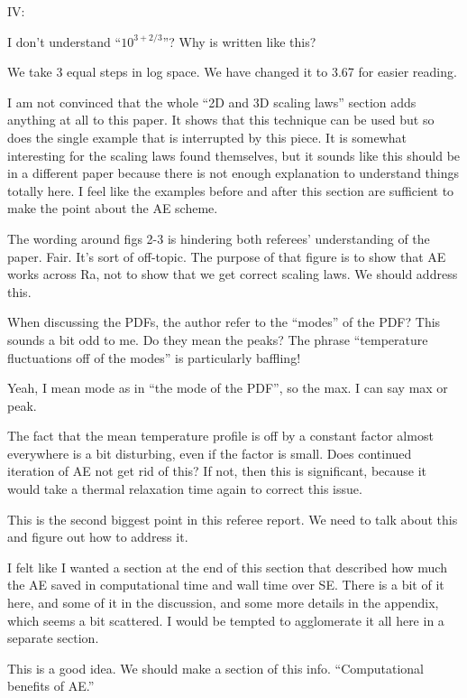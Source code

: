 \documentclass[aps, 11pt, singlecolumn]{revtex4-1} %
\begin{document}
\begin{singlespace}
\begin{myquotation}
IV:

I don’t understand ``$10^{3+2/3}$''? Why is written like this?
\end{myquotation}
We take 3 equal steps in log space. We have changed it to 3.67 for easier reading.


\begin{myquotation}
I am not convinced that the whole ``2D and 3D scaling laws'' section
adds anything at all to this paper. It shows that this technique can
be used but so does the single example that is interrupted by this
piece. It is somewhat interesting for the scaling laws found
themselves, but it sounds like this should be in a different paper
because there is not enough explanation to understand things totally
here. I feel like the examples before and after this section are
sufficient to make the point about the AE scheme.
\end{myquotation}
The wording around figs 2-3 is hindering both referees' understanding of the paper.
Fair. It's sort of off-topic. The purpose of that figure is to show that
AE works across Ra, not to show that we get correct scaling laws. We
should address this.

\begin{myquotation}
When discussing the PDFs, the author refer to the “modes” of the PDF?
This sounds a bit odd to me. Do they mean the peaks? The phrase
“temperature fluctuations off of the modes” is particularly baffling!
\end{myquotation}
Yeah, I mean mode as in ``the mode of the PDF'', so the max. I can say max
or peak.

\begin{myquotation}
The fact that the mean temperature profile is off by a constant factor
almost everywhere is a bit disturbing, even if the factor is small.
Does continued iteration of AE not get rid of this? If not, then this
is significant, because it would take a thermal relaxation time again
to correct this issue.
\end{myquotation}
This is the second biggest point in this referee report. We need to talk about this
and figure out how to address it.

\begin{myquotation}
I felt like I wanted a section at the end of this section that
described how much the AE saved in computational time and wall time
over SE. There is a bit of it here, and some of it in the discussion,
and some more details in the appendix, which seems a bit scattered. I
would be tempted to agglomerate it all here in a separate section.
\end{myquotation}
This is a good idea. We should make a section of this info.
``Computational benefits of AE.''


\end{singlespace}
\end{document}
